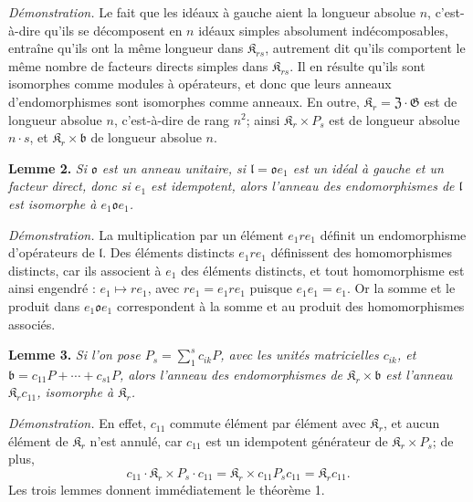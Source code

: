\noindent\emph{Démonstration.} Le fait que les idéaux à gauche aient la longueur absolue \(n\), c'est-à-dire qu'ils se décomposent en \(n\) idéaux simples absolument indécomposables, entraîne qu'ils ont la même longueur dans \(\mathfrak K_{rs}\), autrement dit qu'ils comportent le même nombre de facteurs directs simples dans \(\mathfrak K_{rs}\). Il en résulte qu'ils sont isomorphes comme modules à opérateurs, et donc que leurs anneaux d'endomorphismes sont isomorphes comme anneaux. En outre, \(\mathfrak K_r=\mathfrak Z\cdot\mathfrak G\) est de longueur absolue \(n\), c'est-à-dire de rang \(n^2\); ainsi \(\mathfrak K_r\times P_s\) est de longueur absolue \(n\cdot s\), et \(\mathfrak K_r\times\mathfrak b\) de longueur absolue \(n\).

\noindent\textbf{Lemme 2.} \emph{Si \(\mathfrak o\) est un anneau unitaire, si \(\mathfrak l=\mathfrak o e_1\) est un idéal à gauche et un facteur direct, donc si \(e_1\) est idempotent, alors l'anneau des endomorphismes de \(\mathfrak l\) est isomorphe à \(e_1\mathfrak o e_1\).}

\noindent\emph{Démonstration.} La multiplication par un élément \(e_1re_1\) définit un endomorphisme d'opérateurs de \(\mathfrak l\). Des éléments distincts \(e_1re_1\) définissent des homomorphismes distincts, car ils associent à \(e_1\) des éléments distincts, et tout homomorphisme est ainsi engendré : \(e_1\mapsto re_1\), avec \(re_1=e_1re_1\) puisque \(e_1e_1=e_1\). Or la somme et le produit dans \(e_1\mathfrak o e_1\) correspondent à la somme et au produit des homomorphismes associés.

\noindent\textbf{Lemme 3.} \emph{Si l'on pose \(P_s=\sum_1^s c_{ik}P\), avec les unités matricielles \(c_{ik}\), et \(\mathfrak b=c_{11}P+\cdots+c_{s1}P\), alors l'anneau des endomorphismes de \(\mathfrak K_r\times\mathfrak b\) est l'anneau \(\mathfrak K_rc_{11}\), isomorphe à \(\mathfrak K_r\).}

\noindent\emph{Démonstration.} En effet, \(c_{11}\) commute élément par élément avec \(\mathfrak K_r\), et aucun élément de \(\mathfrak K_r\) n'est annulé, car \(c_{11}\) est un idempotent générateur de \(\mathfrak K_r\times P_s\); de plus,
\[
c_{11}\cdot\mathfrak K_r\times P_s\cdot c_{11}
=\mathfrak K_r\times c_{11}P_sc_{11}
=\mathfrak K_rc_{11}.
\]
Les trois lemmes donnent immédiatement le théorème 1.

